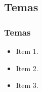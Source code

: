 \subsection[Temas]{Temas}\label{subsec:seminarios-temas}



\begin{frame}[t]\frametitle{Temas}
  
  \begin{itemize}
    \justifying{}
    \setlength\itemsep{1em}
    \item Item 1.
    \item Item 2.
    \item Item 3.
  \end{itemize}
  
\end{frame}
